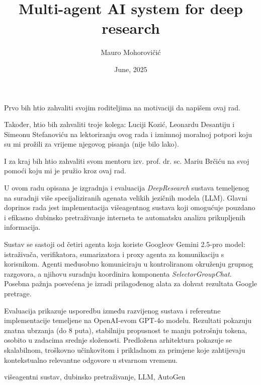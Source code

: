 \documentclass[zavrsnirad]{fer}
\title{Multi-agent AI system for deep research}
\author{Mauro Mohorovičić}
\date{June, 2025}
\begin{document}
\maketitle
\begin{zahvale}
    Prvo bih htio zahvaliti svojim roditeljima na motivaciji da napišem ovaj rad.
    
    Također, htio bih zahvaliti troje kolega: Luciji Kozić, Leonardu Desantiju i Simeonu Stefanoviću na lektoriranju ovog rada i iznimnoj moralnoj potpori koju su mi prožili za vrijeme njegovog pisanja (nije bilo lako).
    
    I za kraj bih htio zahvaliti svom mentoru izv. prof. dr. sc. Mariu Brčiću na svoj pomoći  koju mi je pružio kroz ovaj rad.
\end{zahvale}
\mainmatter
\tableofcontents

\begin{sazetak}
U ovom radu opisana je izgradnja i evaluacija \textit{DeepResearch} sustava temeljenog na suradnji više specijaliziranih agenata velikih jezičnih modela (LLM). Glavni doprinos rada jest implementacija višeagentnog sustava koji omogućuje pouzdano i efikasno dubinsko pretraživanje interneta te automatsku analizu prikupljenih informacija.

Sustav se sastoji od četiri agenta koja koriste Googleov Gemini 2.5-pro model: istraživača, verifikatora, sumarizatora i proxy agenta za komunikaciju s korisnikom. Agenti međusobno komuniciraju u kontroliranom okruženju grupnog razgovora, a njihovu suradnju koordinira komponenta \textit{SelectorGroupChat}. Posebna pažnja posvećena je izradi prilagođenog alata za dohvat rezultata Google pretrage.

Evaluacija prikazuje usporedbu između razvijenog sustava i referentne implementacije temeljene na OpenAI-evom GPT-4o modelu. Rezultati pokazuju znatna ubrzanja (do 8 puta), stabilniju propusnost te manju potrošnju tokena, osobito u zadacima srednje složenosti. Predložena arhitektura pokazuje se skalabilnom, troškovno učinkovitom i prikladnom za primjene koje zahtijevaju kontekstualno relevantne odgovore u stvarnom vremenu.
\end{sazetak}


\begin{kljucnerijeci}
višeagentni sustav, dubinsko pretraživanje, LLM, AutoGen
\end{kljucnerijeci}
\end{document}
